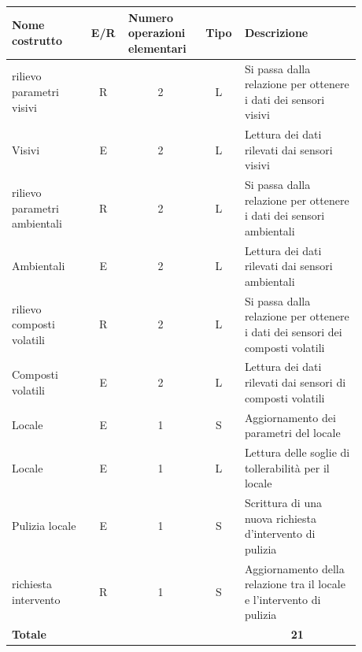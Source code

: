 \documentclass[12pt,a4paper]{article}
\begin{document}
\begin{center}\setlength{\extrarowheight}{1.5pt}\begin{longtable}{|p{0.2\linewidth}|p{0.1\linewidth}|p{0.175\linewidth}|p{0.1\linewidth}|p{0.3\linewidth}|}\hline \textbf{Nome costrutto}   & \multicolumn{1}{|c|}{\textbf{E/R}} & \textbf{Numero operazioni elementari} & \multicolumn{1}{|c|}{\textbf{Tipo}} & \textbf{Descrizione}\\ 
\hline
rilievo parametri visivi
 & 
\multicolumn{1}{|c|}{R}
 & 
\multicolumn{1}{|c|}{2}
 & 
\multicolumn{1}{|c|}{L}
 & 
Si passa dalla relazione per ottenere i dati dei sensori visivi
\\
\hline
Visivi
 & 
\multicolumn{1}{|c|}{E}
 & 
\multicolumn{1}{|c|}{2}
 & 
\multicolumn{1}{|c|}{L}
 & 
Lettura dei dati rilevati dai sensori visivi
\\
\hline
rilievo parametri ambientali
 & 
\multicolumn{1}{|c|}{R}
 & 
\multicolumn{1}{|c|}{2}
 & 
\multicolumn{1}{|c|}{L}
 & 
Si passa dalla relazione per ottenere i dati dei sensori ambientali
\\
\hline
Ambientali
 & 
\multicolumn{1}{|c|}{E}
 & 
\multicolumn{1}{|c|}{2}
 & 
\multicolumn{1}{|c|}{L}
 & 
Lettura dei dati rilevati dai sensori ambientali
\\
\hline
rilievo composti volatili
 & 
\multicolumn{1}{|c|}{R}
 & 
\multicolumn{1}{|c|}{2}
 & 
\multicolumn{1}{|c|}{L}
 & 
Si passa dalla relazione per ottenere i dati dei sensori dei composti volatili
\\
\hline
Composti volatili
 & 
\multicolumn{1}{|c|}{E}
 & 
\multicolumn{1}{|c|}{2}
 & 
\multicolumn{1}{|c|}{L}
 & 
Lettura dei dati rilevati dai sensori di composti volatili
\\
\hline
Locale
 & 
\multicolumn{1}{|c|}{E}
 & 
\multicolumn{1}{|c|}{1}
 & 
\multicolumn{1}{|c|}{S}
 & 
Aggiornamento dei parametri del locale
\\
\hline
Locale
 & 
\multicolumn{1}{|c|}{E}
 & 
\multicolumn{1}{|c|}{1}
 & 
\multicolumn{1}{|c|}{L}
 & 
Lettura delle soglie di tollerabilità per il locale
\\
\hline
Pulizia locale
 & 
\multicolumn{1}{|c|}{E}
 & 
\multicolumn{1}{|c|}{1}
 & 
\multicolumn{1}{|c|}{S}
 & 
Scrittura di una nuova richiesta d'intervento di pulizia
\\
\hline
richiesta intervento
 & 
\multicolumn{1}{|c|}{R}
 & 
\multicolumn{1}{|c|}{1}
 & 
\multicolumn{1}{|c|}{S}
 & 
Aggiornamento della relazione tra il locale e l'intervento di pulizia
\\
\hline
\multicolumn{4}{|l|}{\textbf{Totale}}
 & 
\multicolumn{1}{|c|}{\textbf{21}}
\\
\hline
\end{longtable}\end{center}
\end{document}
